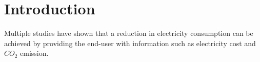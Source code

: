 \documentclass[Main]{subfiles}
\begin{document}
\section{Introduction} %
\label{sec:introduction}
Multiple studies have shown that a reduction in electricity consumption can be achieved by providing the end-user with information such as electricity cost and $CO_2$ emission. 



\end{document}
